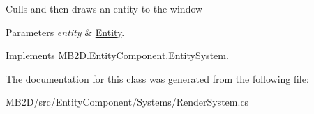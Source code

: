 Culls and then draws an entity to the window 


\begin{DoxyParams}{Parameters}
{\em entity} & \hyperlink{class_m_b2_d_1_1_entity_component_1_1_entity}{Entity}.\\
\hline
\end{DoxyParams}


Implements \hyperlink{class_m_b2_d_1_1_entity_component_1_1_entity_system_abbf83b87cb5d12754fb058cef50451fa}{M\+B2\+D.\+Entity\+Component.\+Entity\+System}.



The documentation for this class was generated from the following file\+:\begin{DoxyCompactItemize}
\item 
M\+B2\+D/src/\+Entity\+Component/\+Systems/Render\+System.\+cs\end{DoxyCompactItemize}
